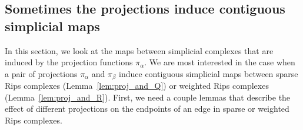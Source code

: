 \documentclass[a4paper]{article}
\newcommand{\proj}{\pi}
\begin{document}
\begin{center}
\end{center}






\subsection{Sometimes the projections induce contiguous simplicial maps} \label{sub:sometimes_the_projections_induce_contiguous_simplicial_maps}

  In this section, we look at the maps between simplicial complexes that are induced by the projection functions $\proj_\alpha$.
  We are most interested in the case when a pair of projections $\proj_\alpha$ and $\proj_\beta$ induce contiguous simplicial maps between sparse Rips complexes (Lemma~\ref{lem:proj_and_Q}) or weighted Rips complexes (Lemma~\ref{lem:proj_and_R}).
  First, we need a couple lemmas that describe the effect of different projections on the endpoints of an edge in sparse or weighted Rips complexes.
\end{document}
